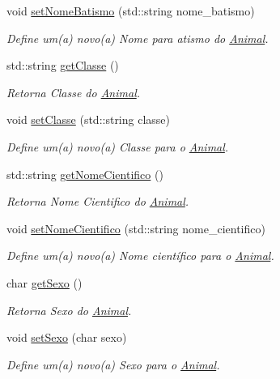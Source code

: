\begin{DoxyCompactItemize}
void \hyperlink{classAnimal_a6f77d89ef0c02d85dfe1dd7508122ce3}{set\+Nome\+Batismo} (std\+::string nome\+\_\+batismo)
\begin{DoxyCompactList}\small\item\em Define um(a) novo(a) Nome para atismo do \hyperlink{classAnimal}{Animal}. \end{DoxyCompactList}\item 
std\+::string \hyperlink{classAnimal_a22e54ff48117237f9a201f5eca0eea81}{get\+Classe} ()
\begin{DoxyCompactList}\small\item\em Retorna Classe do \hyperlink{classAnimal}{Animal}. \end{DoxyCompactList}\item 
void \hyperlink{classAnimal_ae1956de8a017d0b1cd506935cd1a57e0}{set\+Classe} (std\+::string classe)
\begin{DoxyCompactList}\small\item\em Define um(a) novo(a) Classe para o \hyperlink{classAnimal}{Animal}. \end{DoxyCompactList}\item 
std\+::string \hyperlink{classAnimal_a9b316bf80a121cd5dc077158055c162f}{get\+Nome\+Cientifico} ()
\begin{DoxyCompactList}\small\item\em Retorna Nome Cientifico do \hyperlink{classAnimal}{Animal}. \end{DoxyCompactList}\item 
void \hyperlink{classAnimal_ad2e0ffb0dcb6b58467010d9f11488899}{set\+Nome\+Cientifico} (std\+::string nome\+\_\+cientifico)
\begin{DoxyCompactList}\small\item\em Define um(a) novo(a) Nome científico para o \hyperlink{classAnimal}{Animal}. \end{DoxyCompactList}\item 
char \hyperlink{classAnimal_a7349027418d900a9cd7cfc32001b6f7d}{get\+Sexo} ()
\begin{DoxyCompactList}\small\item\em Retorna Sexo do \hyperlink{classAnimal}{Animal}. \end{DoxyCompactList}\item 
void \hyperlink{classAnimal_aab32d5ad6689a4e19cfd43a303c939af}{set\+Sexo} (char sexo)
\begin{DoxyCompactList}\small\item\em Define um(a) novo(a) Sexo para o \hyperlink{classAnimal}{Animal}. \end{DoxyCompactList}\item 

\end{DoxyCompactItemize}
